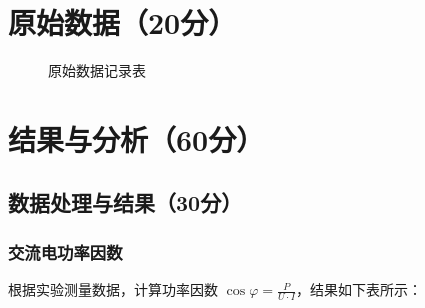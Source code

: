 \documentclass{../../templates/Report}%
\begin{document}
\begin{fullreportonly}
    \section{原始数据（20分）}
    \begin{figure}[H]
        \centering
        \caption{原始数据记录表}
    \end{figure}

    \section{结果与分析（60分）}

    \subsection{数据处理与结果（30分）}

    \subsubsection{交流电功率因数}

    根据实验测量数据，计算功率因数 $\cos\varphi = \frac{P}{U \cdot I}$，结果如下表所示：


\end{fullreportonly}
\end{document}
